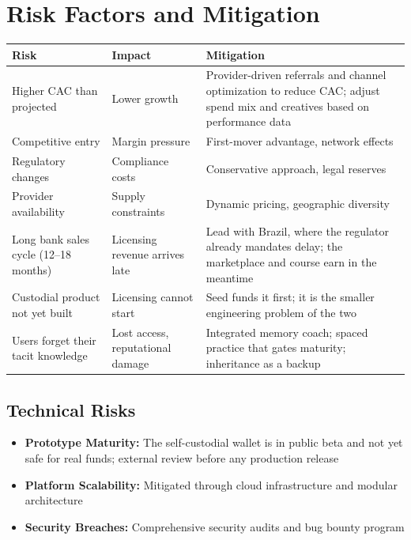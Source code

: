 
\section{Risk Factors and Mitigation}

\begin{table}[H]
\centering
\begin{tabularx}{\linewidth}{l X X}
\toprule
Risk & Impact & Mitigation \\\midrule
Higher CAC than projected & Lower growth & Provider-driven referrals and channel optimization to reduce CAC; adjust spend mix and creatives based on performance data \\
Competitive entry & Margin pressure & First-mover advantage, network effects \\
Regulatory changes & Compliance costs & Conservative approach, legal reserves \\
Provider availability & Supply constraints & Dynamic pricing, geographic diversity \\
Long bank sales cycle (12--18 months) & Licensing revenue arrives late & Lead with Brazil, where the regulator already mandates delay; the marketplace and course earn in the meantime \\
Custodial product not yet built & Licensing cannot start & Seed funds it first; it is the smaller engineering problem of the two \\
Users forget their tacit knowledge & Lost access, reputational damage & Integrated memory coach; spaced practice that gates maturity; inheritance as a backup \\
\bottomrule
\end{tabularx}
\end{table}

\subsection{Technical Risks}
\begin{itemize}
  \item \textbf{Prototype Maturity:} The self-custodial wallet is in public beta and not yet safe for real funds; external review before any production release
  \item \textbf{Platform Scalability:} Mitigated through cloud infrastructure and modular architecture
  \item \textbf{Security Breaches:} Comprehensive security audits and bug bounty program
\end{itemize}

